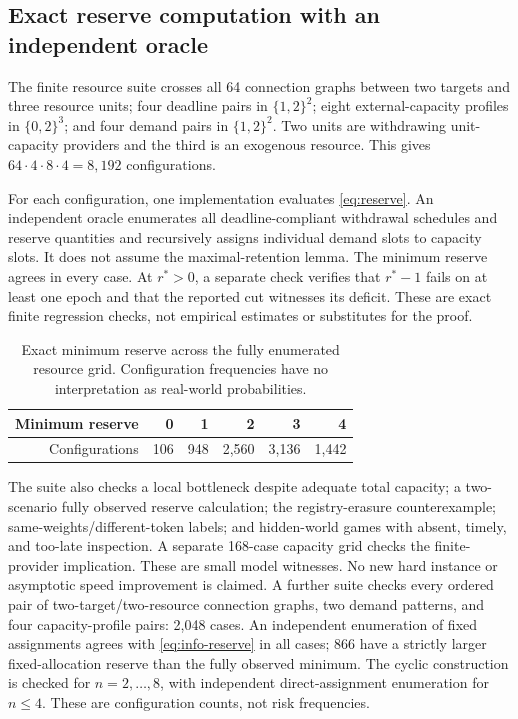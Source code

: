 \subsection{Exact reserve computation with an independent oracle}
The finite resource suite crosses all 64 connection graphs between two targets and three resource units; four deadline pairs in $\{1,2\}^2$; eight external-capacity profiles in $\{0,2\}^3$; and four demand pairs in $\{1,2\}^2$. Two units are withdrawing unit-capacity providers and the third is an exogenous resource. This gives $64\cdot4\cdot8\cdot4=8,192$ configurations.

For each configuration, one implementation evaluates \cref{eq:reserve}. An independent oracle enumerates all deadline-compliant withdrawal schedules and reserve quantities and recursively assigns individual demand slots to capacity slots. It does not assume the maximal-retention lemma. The minimum reserve agrees in every case. At $r^*>0$, a separate check verifies that $r^*-1$ fails on at least one epoch and that the reported cut witnesses its deficit. These are exact finite regression checks, not empirical estimates or substitutes for the proof.

\begin{table}[t]
\centering\small
\caption{Exact minimum reserve across the fully enumerated resource grid. Configuration frequencies have no interpretation as real-world probabilities.}
\label{tab:reserve}
\begin{tabular}{@{}rrrrrr@{}}\toprule
Minimum reserve &0&1&2&3&4\\\midrule
Configurations &106&948&2,560&3,136&1,442\\\bottomrule
\end{tabular}
\end{table}
The suite also checks a local bottleneck despite adequate total capacity; a two-scenario fully observed reserve calculation; the registry-erasure counterexample; same-weights/different-token labels; and hidden-world games with absent, timely, and too-late inspection. A separate 168-case capacity grid checks the finite-provider implication. These are small model witnesses. No new hard instance or asymptotic speed improvement is claimed. A further suite checks every ordered pair of two-target/two-resource connection graphs, two demand patterns, and four capacity-profile pairs: 2,048 cases. An independent enumeration of fixed assignments agrees with \cref{eq:info-reserve} in all cases; 866 have a strictly larger fixed-allocation reserve than the fully observed minimum. The cyclic construction is checked for $n=2,\ldots,8$, with independent direct-assignment enumeration for $n\leq4$. These are configuration counts, not risk frequencies.

